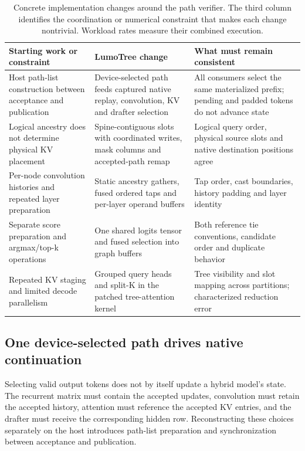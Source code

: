 \documentclass[conference]{IEEEtran}
\newcommand{\sys}{LumoTree}
\begin{document}
\begin{table}[t]
\caption{Concrete implementation changes around the path verifier. The third column identifies the coordination or numerical constraint that makes each change nontrivial. Workload rates measure their combined execution.}
\label{tab:optimization-map}
\centering\footnotesize
\renewcommand{\arraystretch}{1.12}
\begin{tabularx}{\textwidth}{@{}>{\raggedright\arraybackslash}p{}YY@{}}
\toprule
Starting work or constraint & \sys{} change & What must remain consistent \\
\midrule
Host path-list construction between acceptance and publication & Device-selected path feeds captured native replay, convolution, KV and drafter selection & All consumers select the same materialized prefix; pending and padded tokens do not advance state \\
Logical ancestry does not determine physical KV placement & Spine-contiguous slots with coordinated writes, mask columns and accepted-path remap & Logical query order, physical source slots and native destination positions agree \\
Per-node convolution histories and repeated layer preparation & Static ancestry gathers, fused ordered taps and per-layer operand buffers & Tap order, cast boundaries, history padding and layer identity \\
Separate score preparation and argmax/top-k operations & One shared logits tensor and fused selection into graph buffers & Both reference tie conventions, candidate order and duplicate behavior \\
Repeated KV staging and limited decode parallelism & Grouped query heads and split-K in the patched tree-attention kernel & Tree visibility and slot mapping across partitions; characterized reduction error \\
\bottomrule
\end{tabularx}
\end{table}

\subsection{One device-selected path drives native continuation}
Selecting valid output tokens does not by itself update a hybrid model's state. The recurrent matrix must contain the accepted updates, convolution must retain the accepted history, attention must reference the accepted KV entries, and the drafter must receive the corresponding hidden row. Reconstructing these choices separately on the host introduces path-list preparation and synchronization between acceptance and publication.
\end{document}

